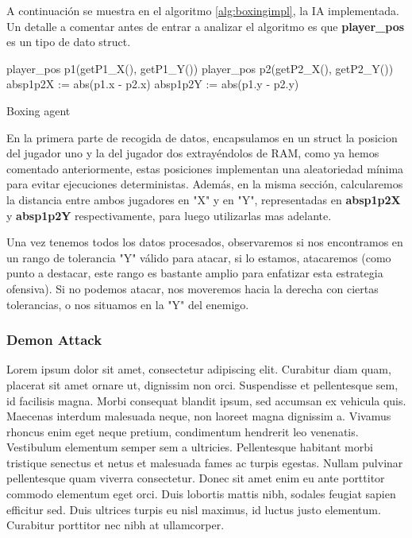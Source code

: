 A continuación se muestra en el algoritmo \ref{alg:boxingimpl}, la IA implementada. Un detalle a comentar antes de entrar a analizar el algoritmo es que \textbf{player\_pos} es un tipo de dato struct.

\begin{algorithm}[H]
	player\_pos p1(getP1\_X(), getP1\_Y())\;
	player\_pos p2(getP2\_X(), getP2\_Y())\;
	absp1p2X := abs(p1.x - p2.x)\;
	absp1p2Y := abs(p1.y - p2.y)\;
	
	\caption{Boxing agent}
	\label{alg:boxingimpl}
\end{algorithm}

En la primera parte de recogida de datos, encapsulamos en un struct la posicion del jugador uno y la del jugador dos extrayéndolos de RAM, como ya hemos comentado anteriormente, estas posiciones implementan una aleatoriedad mínima para evitar ejecuciones deterministas. Además, en la misma sección, calcularemos la distancia entre ambos jugadores en "X" y en "Y", representadas en \textbf{absp1p2X} y \textbf{absp1p2Y} respectivamente, para luego utilizarlas mas adelante.

Una vez tenemos todos los datos procesados, observaremos si nos encontramos en un rango de tolerancia "Y" válido para atacar, si lo estamos, atacaremos (como punto a destacar, este rango es bastante amplio para enfatizar esta estrategia ofensiva). Si no podemos atacar, nos moveremos hacia la derecha  con ciertas tolerancias, o nos situamos en la "Y" del enemigo.


\subsubsection{Demon Attack}
\label{subsec:botsbasicos:da}
Lorem ipsum dolor sit amet, consectetur adipiscing elit. Curabitur diam quam, placerat sit amet ornare ut, dignissim non orci. Suspendisse et pellentesque sem, id facilisis magna. Morbi consequat blandit ipsum, sed accumsan ex vehicula quis. Maecenas interdum malesuada neque, non laoreet magna dignissim a. Vivamus rhoncus enim eget neque pretium, condimentum hendrerit leo venenatis. Vestibulum elementum semper sem a ultricies. Pellentesque habitant morbi tristique senectus et netus et malesuada fames ac turpis egestas. Nullam pulvinar pellentesque quam viverra consectetur. Donec sit amet enim eu ante porttitor commodo elementum eget orci. Duis lobortis mattis nibh, sodales feugiat sapien efficitur sed. Duis ultrices turpis eu nisl maximus, id luctus justo elementum. Curabitur porttitor nec nibh at ullamcorper.

